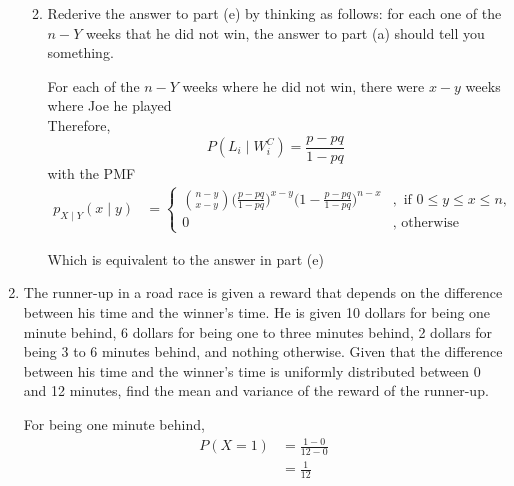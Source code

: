 \documentclass[paper=usletter, fontsize=12pt]{article}
\begin{document}
\begin{enumerate}
\begin{enumerate}
\begin{cproof}
            \end{cproof}

            \item Rederive the answer to part (e) by thinking as follows: for
            each one of the $n - Y$ weeks that he did not win, the answer to
            part (a) should tell you something.
            \begin{cproof}
                For each of the $n-Y$ weeks where he did not win, there were
                $x-y$ weeks where Joe he played\\
                Therefore,
                \begin{equation*}
                    P(L_i \mid W_i^C) = \frac{p-pq}{1-pq}
                \end{equation*}
                with the PMF
                \begin{align*}
                    p_{X \mid Y}(x \mid y) & =
                    \begin{cases}
                        \binom{n-y}{x-y}\big(\frac{p-pq}{1-pq}\big)^{x-y}\big(1-\frac{p-pq}{1-pq}\big)^{n-x} &, \text{ if } 0 \le y \le x \le n,\\
                        0 &, \text{ otherwise }
                    \end{cases}
                \end{align*}
                \endgroup

                Which is equivalent to the answer in part (e) \qedhere

            \end{cproof}

        \end{enumerate}

        \item The runner-up in a road race is given a reward that depends on
        the difference between his time and the winner's time. He is given 10
        dollars for being one minute behind, 6 dollars for being one to three
        minutes behind, 2 dollars for being 3 to 6 minutes behind, and nothing
        otherwise. Given that the difference between his time and the winner's
        time is uniformly distributed between 0 and 12 minutes, find the mean
        and variance of the reward of the runner-up.
        \begin{cproof}

            For being one minute behind,
            \begin{align*}
                P(X=1) & = \frac{1-0}{12-0}\\
                & = \frac{1}{12}
            \end{align*}
            \endgroup


\end{cproof}
\end{enumerate}
\end{document}
